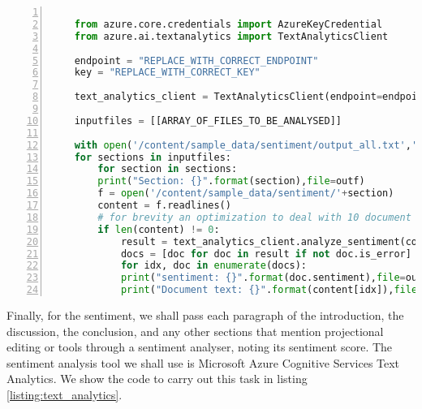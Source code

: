 \noindent\begin{minipage}{\textwidth}
    \begin{lstlisting}[language=Python, numbers=left, caption=Text Analytics code, captionpos=b, label=listing:text_analytics, breaklines=true]

    from azure.core.credentials import AzureKeyCredential
    from azure.ai.textanalytics import TextAnalyticsClient
    
    endpoint = "REPLACE_WITH_CORRECT_ENDPOINT"
    key = "REPLACE_WITH_CORRECT_KEY"
    
    text_analytics_client = TextAnalyticsClient(endpoint=endpoint, credential=AzureKeyCredential(key))
    
    inputfiles = [[ARRAY_OF_FILES_TO_BE_ANALYSED]]
    
    with open('/content/sample_data/sentiment/output_all.txt','a') as outf:
    for sections in inputfiles:
        for section in sections:
        print("Section: {}".format(section),file=outf)
        f = open('/content/sample_data/sentiment/'+section)
        content = f.readlines()
        # for brevity an optimization to deal with 10 document limit is removed
        if len(content) != 0:
            result = text_analytics_client.analyze_sentiment(content, show_opinion_mining=True)
            docs = [doc for doc in result if not doc.is_error]
            for idx, doc in enumerate(docs):
            print("sentiment: {}".format(doc.sentiment),file=outf)
            print("Document text: {}".format(content[idx]),file=outf)
    \end{lstlisting}
\end{minipage}

Finally, for the sentiment, we shall pass each paragraph of the introduction, the discussion, the conclusion, and any other sections that mention projectional editing or tools through a sentiment analyser, noting its sentiment score.
The sentiment analysis tool we shall use is Microsoft Azure Cognitive Services Text Analytics.
We show the code to carry out this task in listing \ref{listing:text_analytics}.


